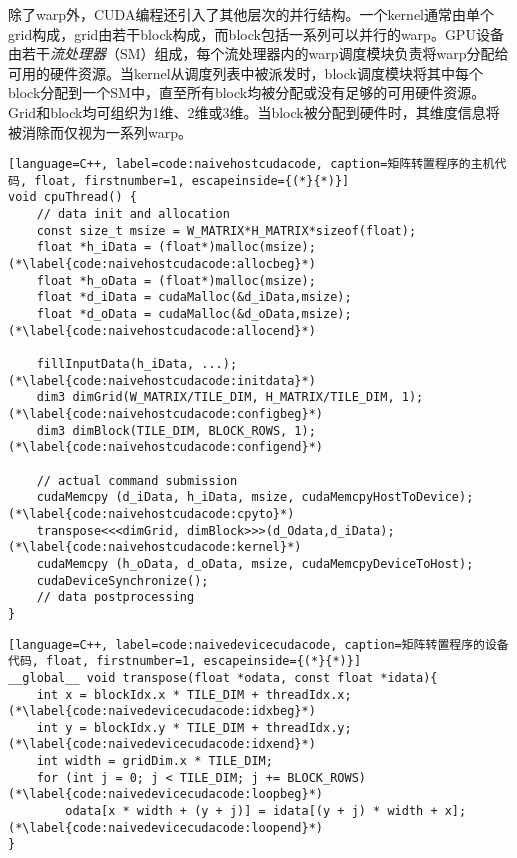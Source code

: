 除了warp外，CUDA编程还引入了其他层次的并行结构。一个kernel通常由单个grid构成，grid由若干block构成，而block包括一系列可以并行的warp。GPU设备由若干\emph{流处理器}（SM）组成，每个流处理器内的warp调度模块负责将warp分配给可用的硬件资源。当kernel从调度列表中被派发时，block调度模块将其中每个block分配到一个SM中，直至所有block均被分配或没有足够的可用硬件资源。Grid和block均可组织为1维、2维或3维。当block被分配到硬件时，其维度信息将被消除而仅视为一系列warp。

\begin{lstlisting}[language=C++, label=code:naivehostcudacode, caption=矩阵转置程序的主机代码, float, firstnumber=1, escapeinside={(*}{*)}]
void cpuThread() {
    // data init and allocation
    const size_t msize = W_MATRIX*H_MATRIX*sizeof(float);
    float *h_iData = (float*)malloc(msize); (*\label{code:naivehostcudacode:allocbeg}*)
    float *h_oData = (float*)malloc(msize);
    float *d_iData = cudaMalloc(&d_iData,msize);
    float *d_oData = cudaMalloc(&d_oData,msize); (*\label{code:naivehostcudacode:allocend}*)

    fillInputData(h_iData, ...); (*\label{code:naivehostcudacode:initdata}*)
    dim3 dimGrid(W_MATRIX/TILE_DIM, H_MATRIX/TILE_DIM, 1); (*\label{code:naivehostcudacode:configbeg}*)
    dim3 dimBlock(TILE_DIM, BLOCK_ROWS, 1); (*\label{code:naivehostcudacode:configend}*)

    // actual command submission
    cudaMemcpy (d_iData, h_iData, msize, cudaMemcpyHostToDevice); (*\label{code:naivehostcudacode:cpyto}*)
    transpose<<<dimGrid, dimBlock>>>(d_Odata,d_iData); (*\label{code:naivehostcudacode:kernel}*)
    cudaMemcpy (h_oData, d_oData, msize, cudaMemcpyDeviceToHost);
    cudaDeviceSynchronize();
    // data postprocessing
}
\end{lstlisting}

\begin{lstlisting}[language=C++, label=code:naivedevicecudacode, caption=矩阵转置程序的设备代码, float, firstnumber=1, escapeinside={(*}{*)}]
__global__ void transpose(float *odata, const float *idata){
    int x = blockIdx.x * TILE_DIM + threadIdx.x; (*\label{code:naivedevicecudacode:idxbeg}*)
    int y = blockIdx.y * TILE_DIM + threadIdx.y; (*\label{code:naivedevicecudacode:idxend}*)
    int width = gridDim.x * TILE_DIM;
    for (int j = 0; j < TILE_DIM; j += BLOCK_ROWS) (*\label{code:naivedevicecudacode:loopbeg}*)
        odata[x * width + (y + j)] = idata[(y + j) * width + x]; (*\label{code:naivedevicecudacode:loopend}*)
}
\end{lstlisting}

